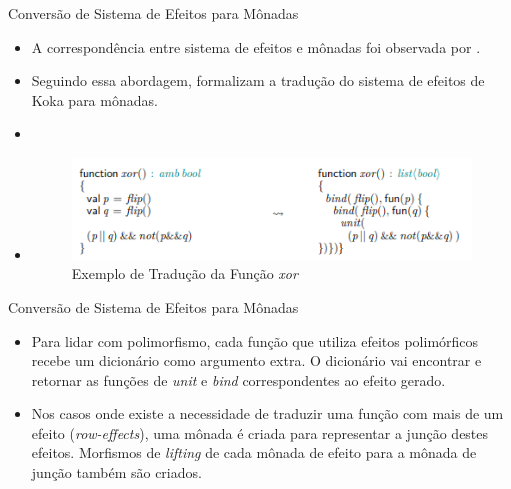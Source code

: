 \begin{frame}{Conversão de Sistema de Efeitos para Mônadas}
    \begin{itemize}
        \item A correspondência entre sistema de efeitos e mônadas foi observada por .

        \item Seguindo essa abordagem,  formalizam a tradução do sistema de efeitos de Koka para mônadas.

        \item[] 

        \item [] \begin{figure}
            \centering
            \includegraphics[width=.9\textwidth]{Figuras/conv.png}
            \caption{Exemplo de Tradução da Função \textit{xor} \cite{vazou2016monads}}
            \label{fig:conv1}
        \end{figure}
    \end{itemize}
\end{frame}

\begin{frame}{Conversão de Sistema de Efeitos para Mônadas}
    \begin{itemize}
        \item Para lidar com polimorfismo, cada função que utiliza efeitos polimórficos recebe um dicionário como argumento extra. O dicionário vai encontrar e retornar as funções de \textit{unit} e \textit{bind} correspondentes ao efeito gerado.

        \item Nos casos onde existe a necessidade de traduzir uma função com mais de um efeito (\textit{row-effects}), uma mônada é criada para representar a junção destes efeitos. Morfismos de \textit{lifting} de cada mônada de efeito para a mônada de junção também são criados.
    \end{itemize}
\end{frame}
